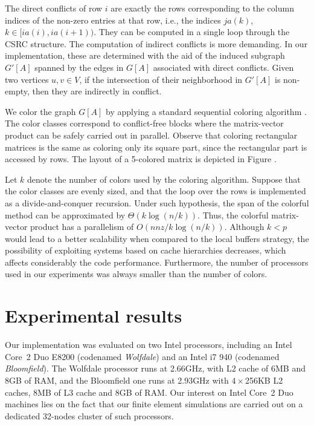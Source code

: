 \documentclass[11pt]{article}
\begin{document}
The direct
conflicts of row $i$ are exactly the rows corresponding to the column indices of
the non-zero entries at that row, i.e., the indices $ja(k)$, $k \in [ia(i), ia(i+1))$.  They can be computed in a
single loop through the CSRC structure.  The computation of indirect conflicts
is more demanding.  In our implementation, these are determined with the aid of
the induced subgraph $G'[A]$ spanned by the edges in $G[A]$ associated with
direct conflicts.  Given two vertices $u, v \in V$, if the intersection of
their neighborhood in $G'[A]$ is non-empty, then they are indirectly in
conflict.

We color the graph $G[A]$ by applying a standard sequential
coloring algorithm \cite{CM83a}.
The color classes correspond to
conflict-free blocks where the matrix-vector product can be safely carried
out in parallel.  Observe that coloring rectangular matrices
is the same as coloring only its square part, since
the rectangular part is accessed by rows.  The layout of a 5-colored
matrix is depicted in Figure .

Let $k$
denote the number of colors used by the coloring algorithm.
Suppose that the color classes are evenly sized, and
that the loop over the rows is implemented as a divide-and-conquer recursion.
Under such hypothesis, the span of the colorful method can be approximated by $\Theta(k\log(n/k))$.
Thus, the colorful matrix-vector product has a parallelism of $O(nnz / k\log(n/k) )$.
Although $k < p$ would lead to a better scalability when compared to the local buffers strategy,
the possibility of exploiting systems based on cache hierarchies decreases,
which affects considerably the code performance.
Furthermore, the number of processors used in our experiments was always smaller than the number of colors.

\section{Experimental results}
\label{sec:results}

Our implementation was evaluated on two Intel processors, including an Intel
Core~2 Duo E8200 (codenamed \textit{Wolfdale}) and an Intel i7 940 (codenamed
\textit{Bloomfield}).  The Wolfdale processor runs at 2.66GHz, with L2 cache of
6MB and 8GB of RAM, and the Bloomfield one runs at 2.93GHz with $4\times$256KB
L2 caches, 8MB of L3 cache and 8GB of RAM. Our interest on Intel Core~2 Duo
machines lies on the fact that our finite element simulations are carried out
on a dedicated 32-nodes cluster of such processors.
\end{document}

